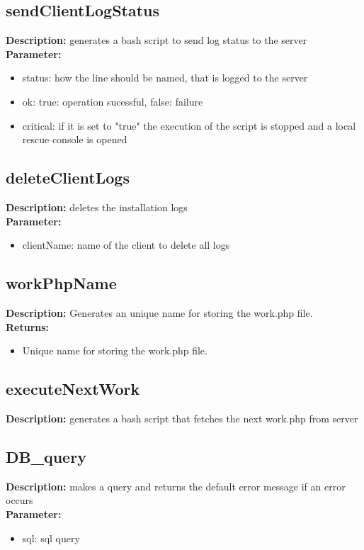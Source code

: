 \subsection{sendClientLogStatus}
\textbf{Description:} generates a bash script to send log status to the server\\
\textbf{Parameter:}
\begin{itemize}
\item status: how the line should be named, that is logged to the server
\item ok: true: operation sucessful, false: failure
\item critical: if it is set to "true" the execution of the script is stopped and a local rescue console is opened
\end{itemize}

\subsection{deleteClientLogs}
\textbf{Description:} deletes the installation logs\\
\textbf{Parameter:}
\begin{itemize}
\item clientName: name of the client to delete all logs
\end{itemize}

\subsection{workPhpName}
\textbf{Description:} Generates an unique name for storing the work.php file.\\
\textbf{Returns:}
\begin{itemize}
\item Unique name for storing the work.php file.
\end{itemize}

\subsection{executeNextWork}
\textbf{Description:} generates a bash script that fetches the next work.php from server\\

\subsection{DB\_query}
\textbf{Description:} makes a query and returns the default error message if an error occurs\\
\textbf{Parameter:}
\begin{itemize}
\item sql: sql query
\end{itemize}

